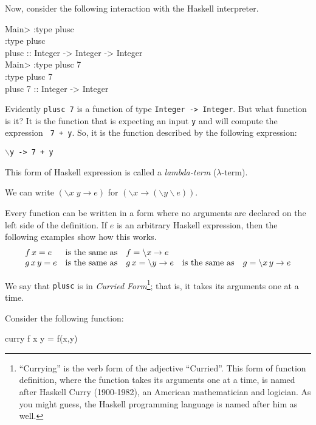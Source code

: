 \documentclass[11pt]{article}
\begin{document}
Now, consider the following interaction with the Haskell interpreter.
\begin{program*}
  \> Main> :type plusc    \\
  \> :type plusc    \\
  \> plusc :: Integer -> Integer -> Integer    \\
  \> Main> :type plusc 7    \\
  \> :type plusc 7    \\
  \> plusc 7 :: Integer -> Integer    \\
\end{program*}
Evidently {\tt{plusc 7}} is a function of type {\tt{Integer -> Integer}}.  But
what function is it?  It is the function that is expecting an input {\tt{y}}
and will compute the expression {\tt{ 7 + y}}.  So, it is the function
described by the following expression:\\ \begin{center}{\tt{$\backslash$y -> 7
+ y}} \end{center} This form of Haskell expression is called a
{\em{lambda-term}} ($\lambda$-term).

We can write $(\backslash x \; y \rightarrow e)$  for  $(\backslash x \rightarrow (\backslash y \backslash e))$.

Every function can be written in a form where no arguments are declared on the
left side of the definition.  If $e$ is an arbitrary Haskell expression, then
the following examples show how this works.
\[\begin{array}{lclcl}
f\, x = e & {\rm{is\ the\ same\ as }} & f = \backslash{}x \rightarrow e \\
g \, x \, y = e & {\rm{is\ the\ same\ as }} & g \, x = \backslash{}y \rightarrow e & {\rm{is\ the\ same\ as }} & g = \backslash{}x\, y \rightarrow e \\
\end{array}\]


We say that {\tt{plusc}} is in {\em{Curried Form}}\footnote{``Currying'' is
the verb form of the adjective ``Curried''.  This form of function definition,
where the function takes its arguments one at a time, is named after Haskell
Curry (1900-1982), an American mathematician and logician.  As you might guess,
the Haskell programming language is named after him as well.}; that is, it
takes its arguments one at a time.


Consider the following function:
\begin{program*}
  \> curry f x y  =  f(x,y)
\end{program*}
\end{document}
